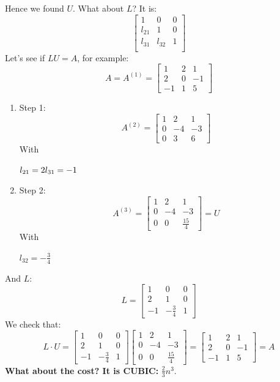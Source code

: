 Hence we found $U$. What about $L$? It is:
$$
\begin{bmatrix}
    1 & 0 & 0\\
    l_{21} & 1 & 0\\
    l_{31} & l_{32} & 1\\
\end{bmatrix}
$$
Let's see if $LU=A$, for example:
$$
A=A^{(1)}=\begin{bmatrix}
    1 & 2 & 1\\
    2 & 0 & -1\\
    -1 & 1 & 5
\end{bmatrix}
$$
\begin{enumerate}
    \item Step 1:
    $$
    A^{(2)}=\begin{bmatrix}
        1 & 2 & 1\\
        0 & -4 & -3\\
        0 & 3 & 6
    \end{bmatrix}
    $$
    With

    $
    l_{21}=2\\
    l_{31}=-1\\
    $
    \item Step 2:
    $$
    A^{(3)}=\begin{bmatrix}
        1 & 2 & 1\\
        0 & -4 & -3\\
        0 & 0 & \frac{15}{4}
    \end{bmatrix}=U
    $$
    With

    $
    l_{32}=-\frac{3}{4}
    $
\end{enumerate}
And $L$:
$$
L=\begin{bmatrix}
    1 & 0 & 0\\
    2 & 1 & 0\\
    -1 & -\frac{3}{4} & 1
\end{bmatrix}
$$
We check that:
$$
L\cdot U=
\begin{bmatrix}
    1 & 0 & 0\\
    2 & 1 & 0\\
    -1 & -\frac{3}{4} & 1
\end{bmatrix}
\begin{bmatrix}
    1 & 2 & 1\\
    0 & -4 & -3\\
    0 & 0 & \frac{15}{4}
\end{bmatrix}=
\begin{bmatrix}
    1 & 2 & 1\\
    2 & 0 & -1\\
    -1 & 1 & 5
\end{bmatrix}=A
$$
\textbf{What about the cost? It is CUBIC: } $\frac{2}{3}n^3$.

